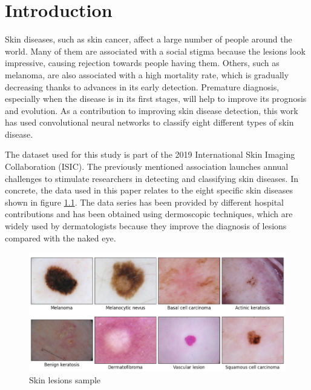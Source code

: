 \chapter{Introduction}
\label{chapter: introduction}


Skin diseases, such as skin cancer,  affect a large number of people around the world. Many of them are associated with a social stigma because the lesions look impressive, causing rejection towards people having them.  Others, such as melanoma, are also associated with a high mortality rate, which is gradually decreasing thanks to advances in its early detection. Premature diagnosis, especially when the disease is in its first stages, will help to improve its prognosis and evolution. As a contribution to improving skin disease detection, this work has used convolutional neural networks to classify eight different types of skin disease. 

The dataset used for this study is part of the 2019 International Skin Imaging Collaboration (ISIC). The previously mentioned association launches annual challenges to stimulate researchers in detecting and classifying skin diseases. In concrete, the data used in this paper relates to the eight specific skin diseases shown in figure \ref{fig: skin_lesions_sample}. The data series has been provided by different hospital contributions and has been obtained using dermoscopic techniques, which are widely used by dermatologists because they improve the diagnosis of lesions compared with the naked eye. 


\begin{figure}[ht]
    \begin{center}
        \includegraphics[scale=0.5]{images/Introduccion/skin_lesion_sample.png}
        \caption{Skin lesions sample}
    \label{fig: skin_lesions_sample}    
    \end{center}
\end{figure}

